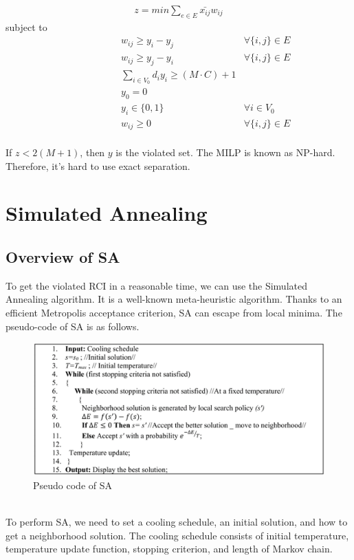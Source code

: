 \documentclass[11pt]{article}
\begin{document}
\begin{spacing}{1.5}
\begin{align}
     z=min \sum_{e \in E} \bar{x_{ij}}w_{ij}
\end{align}
\qquad\qquad\qquad\qquad\qquad\quad subject to
\begin{align}
    &&&&&&& w_{ij} \geq y_i - y_j &\forall \{i,j\}\in E\\
    &&&&&&& w_{ij} \geq y_j - y_i &\forall \{i,j\}\in E\\
    &&&&&&& \sum_{i\in V_0}d_iy_i \geq (M\cdot C)+1\\
    &&&&&&& y_0=0\\
    &&&&&&& y_i\in\{0,1\} &\forall i\in V_0\\
    &&&&&&& w_{ij} \geq 0 &\forall \{i,j\}\in E
\end{align}
\\
\indent If $z<2(M+1)$, then $y$ is the violated set. The MILP is known as NP-hard. Therefore, it's hard to use exact separation.

\newpage
{\centering\section{Simulated Annealing}\subsection{Overview of SA}}
To get the violated RCI in a reasonable time, we can use the Simulated Annealing algorithm. It is a well-known meta-heuristic algorithm. Thanks to an efficient Metropolis acceptance criterion, SA can escape from local minima. The pseudo-code of SA is as follows.
\begin{figure}[htb!]
    \centerline{\includegraphics[width=15cm]{image1.png}}
    \caption{Pseudo code of SA}
\end{figure}
\\ 
\indent To perform SA, we need to set a cooling schedule, an initial solution, and how to get a neighborhood solution. The cooling schedule consists of initial temperature, temperature update function, stopping criterion, and length of Markov chain.



\end{spacing}
\end{document}
